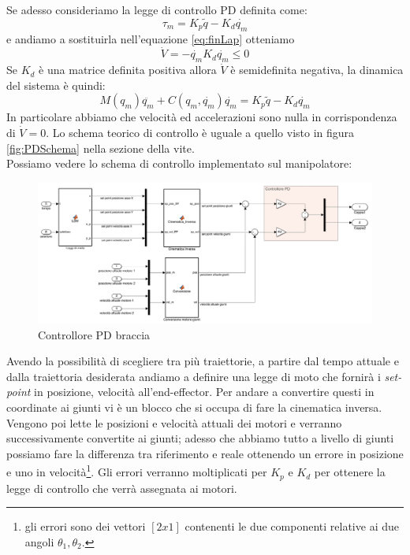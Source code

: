 Se adesso consideriamo la legge di controllo PD definita come:
\begin{equation}
\tau_m = K_p\tilde{q} - K_d\dot{q_m}
\end{equation}
e andiamo a sostituirla nell'equazione \ref{eq:finLap} otteniamo
\begin{equation*}
\dot{V} = -\dot{q_m}K_d \dot{q_m} \le 0
\end{equation*}
Se $K_d$ è una matrice definita positiva allora $\dot{V}$ è semidefinita negativa, la dinamica del sistema è quindi:
\begin{equation}
M(q_m)\ddot{q_m} + C(q_m,\dot{q_m})\dot{q_m} = K_p\tilde{q}-K_d\dot{q_m}
\end{equation}
In particolare abbiamo che velocità ed accelerazioni sono nulla in corrispondenza di $\dot{V} = 0$. Lo schema teorico di controllo è uguale a quello visto in figura \ref{fig:PDSchema} nella sezione della vite.
\\ Possiamo vedere lo schema di controllo implementato sul manipolatore:
\begin{figure}[ht]
	\begin{center}
		\includegraphics[scale=0.37]{Immagini/Controllori/PDBraccia}
		\caption{Controllore PD braccia}
		\label{fig:PDBraccia}
	\end{center}
\end{figure}
Avendo la possibilità di scegliere tra più traiettorie, a partire dal tempo attuale e dalla traiettoria desiderata andiamo a definire una legge di moto che fornirà i \textit{set-point} in posizione, velocità all'end-effector. Per andare a convertire questi in coordinate ai giunti vi è un blocco che si occupa di fare la cinematica inversa. Vengono poi lette le posizioni e velocità attuali dei motori e verranno successivamente convertite ai giunti; adesso che abbiamo tutto a livello di giunti possiamo fare la differenza tra riferimento e reale ottenendo un errore in posizione e uno in velocità\footnote{gli errori sono dei vettori $[2x1]$ contenenti le due componenti relative ai due angoli $\theta_1, \theta_2$.}. Gli errori verranno moltiplicati per $K_p$ e $K_d$ per ottenere la legge di controllo che verrà assegnata ai motori.
